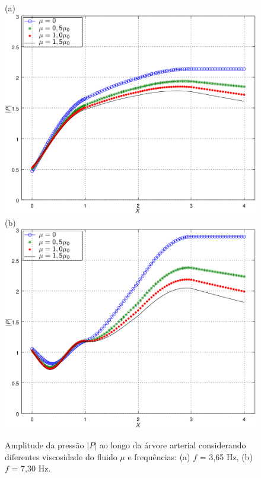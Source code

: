 \documentclass[a4paper,12pt]{monografia}
\theoremstyle{plain}
\theoremstyle{definition}
\theoremstyle{remark}
\begin{document}
\begin{figure}[!htbp]
	\centering
	(a) \\
	\includegraphics[scale=0.7]{figure3-result-new/fig3_P_f3_65_visc_new2.png}\\
	(b)\\
	\includegraphics[scale=0.7]{figure3-result-new/fig3_P_f7_30_visc_new2.png}\\
	\caption{Amplitude da pressão $|P|$ ao longo da árvore arterial considerando diferentes viscosidade do fluido $\mu$ e frequências: (a) $f$ = 3,65 Hz, (b)  $f$ = 7,30 Hz. }
	\label{fig3a:arterial-tree}%
\end{figure}
\end{document}
